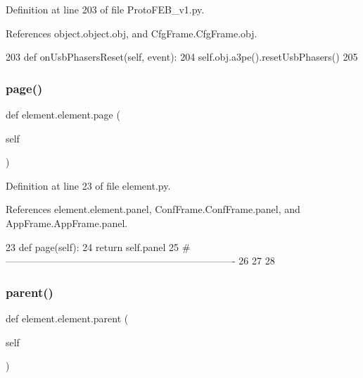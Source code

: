 Definition at line 203 of file Proto\+F\+E\+B\+\_\+v1.\+py.



References object.\+object.\+obj, and Cfg\+Frame.\+Cfg\+Frame.\+obj.


\begin{DoxyCode}
203     \textcolor{keyword}{def }onUsbPhasersReset(self, event):
204         self.obj.a3pe().resetUsbPhasers()
205 
\end{DoxyCode}
\mbox{\label{classelement_1_1element_a80c5e09b291c255b740787b87760fca0}} 
\subsubsection{\texorpdfstring{page()}{page()}}
{\footnotesize\ttfamily def element.\+element.\+page (\begin{DoxyParamCaption}\item[{}]{self }\end{DoxyParamCaption})\hspace{0.3cm}{\ttfamily [inherited]}}



Definition at line 23 of file element.\+py.



References element.\+element.\+panel, Conf\+Frame.\+Conf\+Frame.\+panel, and App\+Frame.\+App\+Frame.\+panel.


\begin{DoxyCode}
23     \textcolor{keyword}{def }page(self):
24         \textcolor{keywordflow}{return} self.panel
25 \textcolor{comment}{#----------------------------------------------------------------------}
26 
27     
28 \end{DoxyCode}
\mbox{\label{classelement_1_1element_a2705e2b608db596bedf2a206bda42d12}} 
\subsubsection{\texorpdfstring{parent()}{parent()}}
{\footnotesize\ttfamily def element.\+element.\+parent (\begin{DoxyParamCaption}\item[{}]{self }\end{DoxyParamCaption})\hspace{0.3cm}{\ttfamily [inherited]}}



